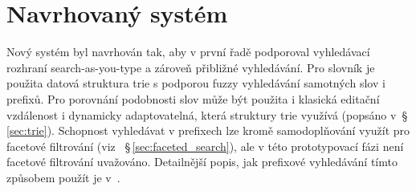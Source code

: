 \documentclass[11pt,letterpaper,oneside,openright]{book}
\begin{document}
%
%


\section{Navrhovaný systém}
Nový systém byl navrhován tak, aby v první řadě podporoval vyhledávací rozhraní
search-as-you-type a zároveň přibližné vyhledávání. Pro slovník je použita
datová struktura trie s podporou fuzzy vyhledávání samotných slov i prefixů.
Pro porovnání podobnosti slov může být použita i klasická editační vzdálenost i
dynamicky adaptovatelná, která struktury trie využívá (popsáno
v~\S\,\ref{sec:trie}). Schopnost vyhledávat v prefixech lze kromě
samodoplňování využít pro facetové filtrování (viz
~\S\,\ref{sec:faceted_search}), ale v této prototypovací fázi není facetové
filtrování uvažováno. Detailnější popis, jak prefixové vyhledávání tímto
způsobem použít je v~\cite{Bast_abstractwhen}.
\end{document}

